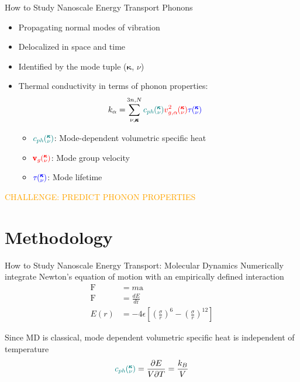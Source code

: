 \documentclass{beamer}
\newcommand{\kv}{\mspace{-4.0mu}\left(\mspace{-8.0mu}
\begin{smallmatrix}&\pmb{\kappa} \\&\nu\end{smallmatrix}
\mspace{-3.0mu}\right)}
\begin{document}
\begin{frame}{How to Study Nanoscale Energy Transport}
Phonons
\begin{itemize}
\item Propagating normal modes of vibration
\item Delocalized in space and time
\item Identified by the mode tuple ($\pmb{\kappa}$, $\nu$)
\item Thermal conductivity in terms of phonon properties:
\begin{equation}\label{EQ:M:conductivity}
\begin{split}
k_{\mathbf{\alpha}}=&\sum_{\nu,\pmb{\kappa}}^{3n,N} \textcolor{teal}{c_{ph}\kv}
\textcolor{red}{v^{2}_{g,\mathbf{\alpha}}\kv} \textcolor{blue}{\tau\kv}
\end{split}
\end{equation}
\begin{itemize}
\item $\textcolor{teal}{c_{ph}\kv}$: Mode-dependent volumetric specific heat
\item $\textcolor{red}{\pmb{\mathrm{v}}_{g}\kv}$: Mode group velocity
\item $\textcolor{blue}{\tau\kv}$: Mode lifetime
\end{itemize}

\end{itemize}
\textcolor{orange}{CHALLENGE: PREDICT PHONON PROPERTIES}
\end{frame}

\section{Methodology}
\begin{frame}{How to Study Nanoscale Energy Transport: Molecular Dynamics}
Numerically integrate Newton's equation of motion with an empirically defined interaction
\begin{equation}
\begin{split}
\pmb{\mathrm{F}}&=m\pmb{\mathrm{a}}\\
\pmb{\mathrm{F}}&=\frac{dE}{d\pmb{\mathrm{r}}}\\
E(r)&=-4\epsilon\left[\left(\frac{\sigma}{r}\right)^6-\left(\frac{\sigma}{r}\right)^{12}\right]
\end{split}
\end{equation}

Since MD is classical, mode dependent volumetric specific heat is independent of temperature
\begin{equation}\label{EQ:Cph}
\textcolor{teal}{c_{ph}\kv}=\frac{\partial E}{V\partial T}=\frac{k_B}{V}	
\end{equation}
\end{frame}
\end{document}
